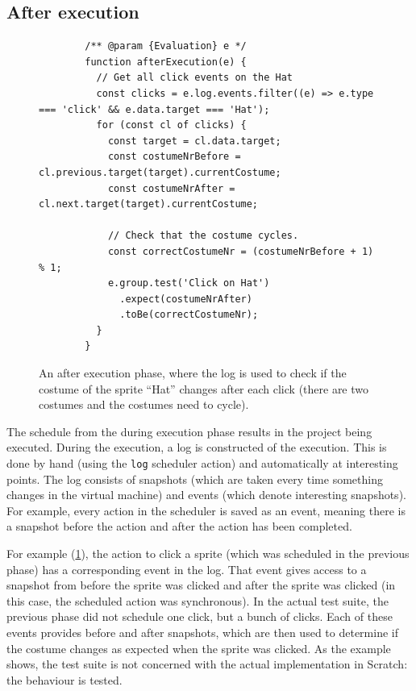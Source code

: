 \documentclass[../main]{subfiles}
\begin{document}
\subsection{After execution}\label{subsec:after-execution}

\begin{figure}
    \begin{verbatim}
        /** @param {Evaluation} e */
        function afterExecution(e) {
          // Get all click events on the Hat
          const clicks = e.log.events.filter((e) => e.type === 'click' && e.data.target === 'Hat');
          for (const cl of clicks) {
            const target = cl.data.target;
            const costumeNrBefore = cl.previous.target(target).currentCostume;
            const costumeNrAfter = cl.next.target(target).currentCostume;

            // Check that the costume cycles.
            const correctCostumeNr = (costumeNrBefore + 1) % 1;
            e.group.test('Click on Hat')
              .expect(costumeNrAfter)
              .toBe(correctCostumeNr);
          }
        }
    \end{verbatim}
    \caption{An after execution phase, where the log is used to check if the costume of the sprite ``Hat'' changes after each click (there are two costumes and the costumes need to cycle).}\label{fig:itch-hat-costum-change}
\end{figure}

The schedule from the during execution phase results in the project being executed.
During the execution, a log is constructed of the execution.
This is done by hand (using the \texttt{log} scheduler action) and automatically at interesting points.
The log consists of snapshots (which are taken every time something changes in the virtual machine) and events (which denote interesting snapshots).
For example, every action in the scheduler is saved as an event, meaning there is a snapshot before the action and after the action has been completed.

For example (\cref{fig:itch-hat-costum-change}), the action to click a sprite (which was scheduled in the previous phase) has a corresponding event in the log.
That event gives access to a snapshot from before the sprite was clicked and after the sprite was clicked (in this case, the scheduled action was synchronous).
In the actual test suite, the previous phase did not schedule one click, but a bunch of clicks.
Each of these events provides before and after snapshots, which are then used to determine if the costume changes as expected when the sprite was clicked.
As the example shows, the test suite is not concerned with the actual implementation in Scratch: the behaviour is tested.
\end{document}
